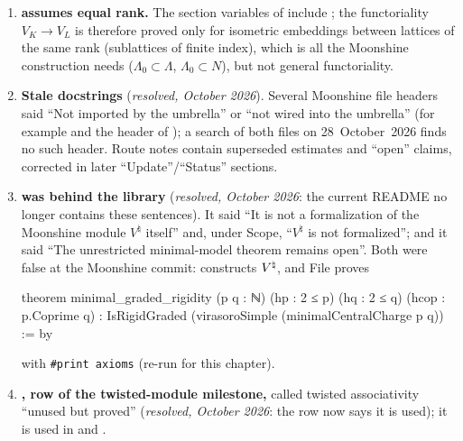 \begin{enumerate}
\begin{leancode}
\end{leancode}
  and in the vendored library, File :
\begin{leancode}
def IsUnimodular : Prop := IsUnit Γ.det
\end{leancode}
  ( has an unrelated  for VOAs.) No theorem in the
  library proves that the two lattice notions agree; results stated with one cannot be fed the other
  without a bridge.
\item \textbf{ assumes equal rank.} The section variables of
   include ; the
  functoriality $V_K\to V_L$ is therefore proved only for isometric embeddings between lattices of the
  same rank (sublattices of finite index), which is all the Moonshine construction needs
  ($\Lambda_0\subset\Lambda$, $\Lambda_0\subset N$), but not general functoriality.
\item \textbf{Stale docstrings} (\emph{resolved, October 2026}). Several Moonshine file headers said ``Not imported by the
  umbrella'' or ``not wired into the umbrella'' (for example  and the
  header of ); a search of both files on 28~October~2026 finds no such header. Route notes contain superseded estimates and ``open'' claims, corrected in later
  ``Update''/``Status'' sections.
\item \textbf{ was behind the library} (\emph{resolved, October 2026}: the current README no longer
  contains these sentences). It said ``It is not a formalization of the
  Moonshine module $V^\natural$ itself'' and, under Scope, ``$V^\natural$ is not formalized''; and it said
  ``The unrestricted minimal-model theorem remains open''. Both were false at the Moonshine commit:
   constructs ${V^{\natural}}$, and File
   proves
\begin{leancode}
theorem minimal_graded_rigidity (p q : ℕ) (hp : 2 ≤ p) (hq : 2 ≤ q)
    (hcop : p.Coprime q) :
    IsRigidGraded (virasoroSimple (minimalCentralCharge p q)) := by
\end{leancode}
  with \texttt{\#print axioms}  (re-run for this
  chapter).
\item \textbf{, row of the twisted-module milestone,} called twisted associativity
   ``unused but proved'' (\emph{resolved, October 2026}: the row now says it is used); it is used in
   and .
\end{enumerate}

